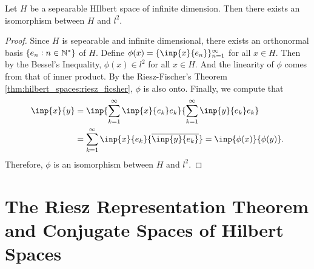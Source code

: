 \begin{thm}
Let $H$ be a sepearable HIlbert space of infinite dimension. 
Then there exists an isomorphism between $H$ and $l^2$. 
\end{thm}
\begin{proof}
Since $H$ is sepearable and infinite dimensional, there exists an 
orthonormal basis $\{e_n: n \in \mathbb{N}^\ast\}$ of $H$. 
Define $\phi(x) = \{ \inp{x}{e_n} \}_{n=1}^{\infty}$ for all $x \in H$. 
Then by the Bessel's Inequality, $\phi(x) \in l^2$ for all $x \in H$. 
And the linearity of $\phi$ comes from that of inner product. 
By the Riesz-Fischer's Theorem \ref{thm:hilbert_spaces:riesz_ficsher}, 
$\phi$ is also onto. 
Finally, we compute that 
\begin{equation*}
    \begin{aligned}
        \inp{x}{y} &= \inp{\sum_{k=1}^{\infty}\inp{x}{e_k} e_k}
        {\sum_{k=1}^{\infty} \inp{y}{e_k}e_k} \\
        &= \sum_{k=1}^{\infty} \inp{x}{e_k}{\conj{\inp{y}{e_k}}} 
        = \inp{\phi(x)}{\phi(y)}.
    \end{aligned}
\end{equation*}
Therefore, $\phi$ is an isomorphism between $H$ and $l^2$. 
\end{proof}

\section{The Riesz Representation Theorem and Conjugate Spaces of Hilbert Spaces}

